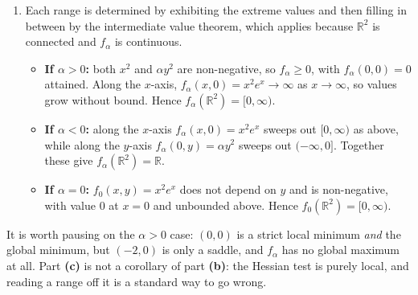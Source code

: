 \begin{exercisesolution}
\begin{enumerate}[label=\textbf{(\alph*)}]
  \item Each range is determined by exhibiting the extreme values and then filling in between by the
    intermediate value theorem, which applies because $\mathbb{R}^2$ is connected and $f_\alpha$ is
    continuous.
\begin{itemize}
  \item \textbf{If $\alpha > 0$:} both $x^2$ and $\alpha y^2$ are non-negative, so $f_\alpha \geq 0$,
    with $f_\alpha(0,0) = 0$ attained. Along the $x$-axis, $f_\alpha(x,0) = x^2 e^x \to \infty$ as
    $x \to \infty$, so values grow without bound. Hence $f_\alpha(\mathbb{R}^2) = [0,\infty)$.
  \item \textbf{If $\alpha < 0$:} along the $x$-axis $f_\alpha(x,0) = x^2 e^x$ sweeps out
    $[0,\infty)$ as above, while along the $y$-axis $f_\alpha(0,y) = \alpha y^2$ sweeps out
    $(-\infty,0]$. Together these give $f_\alpha(\mathbb{R}^2) = \mathbb{R}$.
  \item \textbf{If $\alpha = 0$:} $f_0(x,y) = x^2 e^x$ does not depend on $y$ and is non-negative,
    with value $0$ at $x = 0$ and unbounded above. Hence $f_0(\mathbb{R}^2) = [0,\infty)$.
\end{itemize}
\end{enumerate}
\begin{ainote}
It is worth pausing on the $\alpha > 0$ case: $(0,0)$ is a strict local minimum \emph{and} the global
minimum, but $(-2,0)$ is only a saddle, and $f_\alpha$ has no global maximum at all. Part
\textbf{(c)} is not a corollary of part \textbf{(b)}: the Hessian test is purely local, and
reading a range off it is a standard way to go wrong.
\end{ainote}
\end{exercisesolution}
